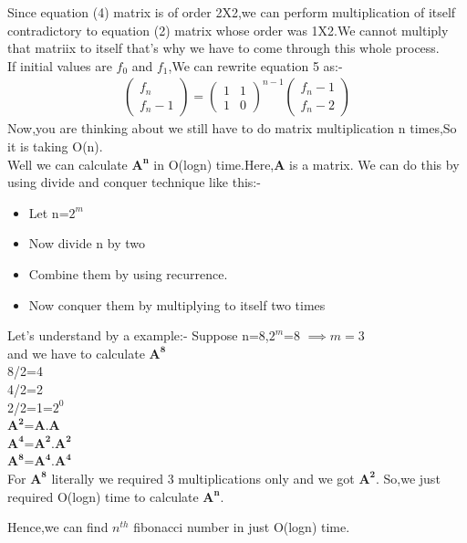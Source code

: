 \documentclass[journal,12pt,twocolumn]{IEEEtran}
\begin{document}
Since equation (4) matrix is of order 2X2,we can perform multiplication of itself contradictory to equation (2) matrix whose order was 1X2.We cannot multiply that matriix to itself that's why we have to come through this whole process.\\
If initial values are $f_0$ and $f_1$,We can rewrite equation 5 as:-
\begin{align}
      \boxed{\begin{pmatrix}f_n\\f_n-1\end{pmatrix}=\begin{pmatrix}1 & 1\\1 & 0\end{pmatrix}^{n-1}\begin{pmatrix}f_n-1\\f_n-2\end{pmatrix}}
      \end{align}
Now,you are thinking about we still have to do matrix multiplication n times,So it is taking O(n).\\
Well we can calculate $\mathbf{A^{n}}$ in O(logn) time.Here,$\mathbf{A}$ is a matrix.
We can do this by using divide and conquer technique like this:-
\begin{itemize}
    \item Let n=$2^m$
    \item Now divide n by two
    \item Combine them by using recurrence.
    \item Now conquer them by multiplying to itself two times
\end{itemize}
Let's understand by a example:-
Suppose n=8,$2^m$=8 $\implies m=3$\\ and we have to calculate $\mathbf{A^8}$\\
8/2=4\\
4/2=2\\
2/2=1=$2^0$\\
$\mathbf{A^2}$=$\mathbf{A}$.$\mathbf{A}$\\
$\mathbf{A^4}$=$\mathbf{A^2}$.$\mathbf{A^2}$\\
$\mathbf{A^8}$=$\mathbf{A^4}$.$\mathbf{A^4}$\\
For $\mathbf{A^8}$ literally we required 3 multiplications only and we got $\mathbf{A^2}$.
So,we just required O(logn) time to calculate $\mathbf{A^n}$.

Hence,we can find $n^{th}$ fibonacci number in just O(logn) time.
\end{document}

